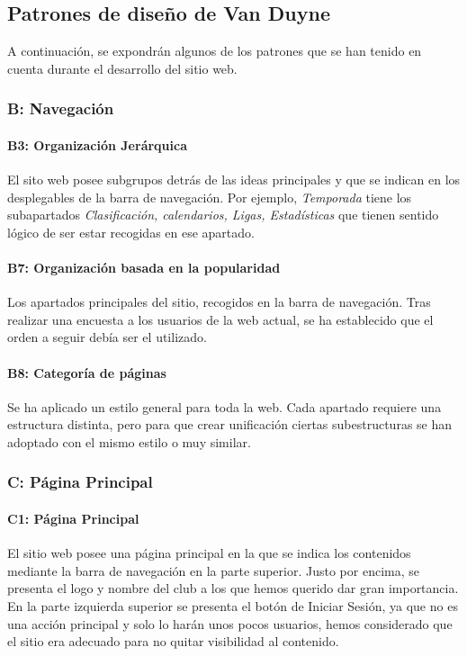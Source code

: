 \documentclass[10pt, spanish, pdftex]{template/UC3M_document}
\begin{document}
\subsection{Patrones de diseño de Van Duyne}
A continuación, se expondrán algunos de los patrones que se han tenido en cuenta durante el desarrollo del sitio web.

\subsubsection{B: Navegación}
\paragraph{B3: Organización Jerárquica}
  El sito web posee subgrupos detrás de las ideas principales y que se indican en los desplegables de la barra de navegación. Por ejemplo, \textit{Temporada} tiene los subapartados \textit{Clasificación, calendarios, Ligas, Estadísticas} que tienen sentido lógico de ser estar recogidas en ese apartado.
\paragraph{B7: Organización basada en la popularidad}
  Los apartados principales del sitio, recogidos en la barra de navegación. Tras realizar una encuesta a los usuarios de la web actual, se ha establecido que el orden a seguir debía ser el utilizado.
\paragraph{B8: Categoría de páginas}
  Se ha aplicado un estilo general para toda la web. Cada apartado requiere una estructura distinta, pero para que crear unificación ciertas subestructuras se han adoptado con el mismo estilo o muy similar.
\subsubsection{C: Página Principal}
\paragraph{C1: Página Principal}
  El sitio web posee una página principal en la que se indica los contenidos mediante la barra de navegación en la parte superior. Justo por encima, se presenta el logo y nombre del club a los que hemos querido dar gran importancia. En la parte izquierda superior se presenta el botón de Iniciar Sesión, ya que no es una acción principal y solo lo harán unos pocos usuarios, hemos considerado que el sitio era adecuado para no quitar visibilidad al contenido.
\end{document}
